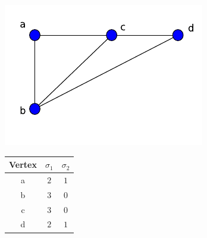 \documentclass[10pt,a4paper]{article}
\begin{document}
             \begin{figure}[H]
             	\centering
             	\begin{minipage}[b]{.30\textwidth}
             		\centering
             		\vspace{0pt}
             		\includegraphics[width=\textwidth]{images/sample-lap2.pdf}
             		\label{spanning}
             	\end{minipage}
             	\hfill
             	\begin{minipage}[b]{.64\textwidth}
             		\centering
             		\vspace{0pt}
             		\setlength{\tabcolsep}{15pt}
             		\renewcommand{\arraystretch}{1.2}
             		\begin{tabular}{|c|c|c|}
             			\hline 
             			Vertex &$\sigma_1$ & $\sigma_2$ \\
             			\hline
             			a & $2$ & $1$ \\
             			b & $3$ & $0$ \\
             			c & $3$ & $0$ \\
             			d & $2$ & $1$ \\
             			\hline
             		\end{tabular}
             	\end{minipage}
             \end{figure}
            
\end{document}
